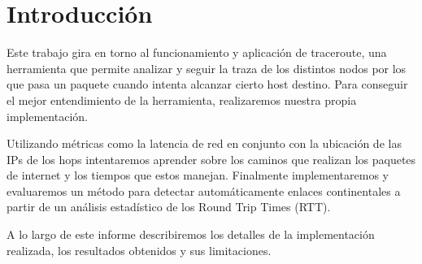 \section{Introducción}

Este trabajo gira en torno al funcionamiento y aplicación de traceroute, una herramienta que permite analizar y seguir la traza de los distintos nodos por los que pasa un paquete cuando intenta alcanzar cierto host destino. Para conseguir el mejor entendimiento de la herramienta, realizaremos nuestra propia implementación.

Utilizando métricas como la latencia de red en conjunto con la ubicación de las IPs de los hops intentaremos aprender sobre los caminos que realizan los paquetes de internet y los tiempos que estos manejan. Finalmente implementaremos y evaluaremos un método para detectar automáticamente enlaces continentales a partir de un análisis estadístico de los Round Trip Times (RTT).

A lo largo de este informe describiremos los detalles de la implementación realizada, los resultados obtenidos y sus limitaciones.